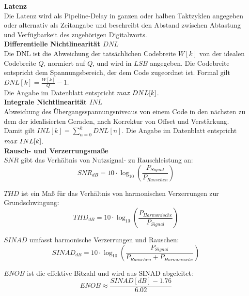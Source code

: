 \documentclass[a4paper, portrait, 12pt]{scrartcl} %
\begin{document}
\textbf{Latenz}\\
Die Latenz wird als Pipeline-Delay in ganzen oder halben Taktzyklen angegeben oder alternativ als Zeitangabe und beschreibt den Abstand zwischen Abtastung und Verfügbarkeit des zugehörigen Digitalworts.\\

\textbf{Differentielle Nichtlinearität $DNL$}\\
Die DNL ist die Abweichung der tatsächlichen Codebreite $W[k]$ von der idealen Codebreite $Q$, normiert auf $Q$, und wird in $LSB$ angegeben. Die Codebreite entspricht dem Spannungsbereich, der dem Code zugeordnet ist. Formal gilt $DNL[k]=\frac{W[k]}{Q}-1$.\\
Die Angabe im Datenblatt entspricht $max\hspace{0.1cm}DNL[k]$.\\

\textbf{Integrale Nichtlinearität $INL$}\\
Abweichung des Übergangsspannungsniveaus von einem Code in den nächsten zu dem der idealisierten Geraden, nach Korrektur von Offset und Verstärkung.\\
Damit gilt $INL[k]=\sum_{n=0}^kDNL[n]$. Die Angabe im Datenblatt entspricht $max\hspace{0.1cm}INL[k]$.\\

\textbf{Rausch- und Verzerrungsmaße}\\
\textbf{$SNR$} gibt das Verhältnis von Nutzsignal- zu Rauschleistung an:
\begin{equation}
	SNR_{dB}=10\cdot \log_{10}\left( \frac{P_{Signal}}{P_{Rauschen}}\right)
\end{equation}

\textbf{$THD$} ist ein Maß für das Verhältnis von harmonischen Verzerrungen zur Grundschwingung:
\begin{equation}
	THD_{dB}=10\cdot \log_{10}\left( \frac{P_{Harmonische}}{P_{Signal}}\right)
\end{equation}

\textbf{$SINAD$} umfasst harmonische Verzerrungen und Rauschen:
\begin{equation}
	SINAD_{dB}=10\cdot \log_{10}\left( \frac{P_{Signal}}{P_{Rauschen}+P_{Harmonische}}\right)
\end{equation}

\textbf{$ENOB$} ist die effektive Bitzahl und wird aus SINAD abgeleitet:
\begin{equation}
	ENOB\approx \frac{SINAD[dB]-1.76}{6.02}
\end{equation}
\end{document}
